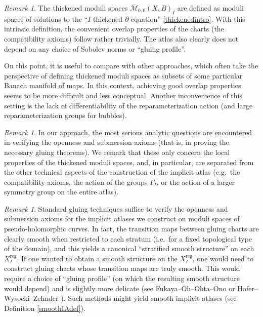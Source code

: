\documentclass[12pt]{article}
\theoremstyle{definition}
\theoremstyle{remark}
\newtheorem{remark}[theorem]{Remark}
\numberwithin{equation}{subsection}
\newcommand{\Mbar}{\overline{\mathcal M}}
\newcommand{\delbar}{\bar\partial}
\newcommand{\reg}{\mathrm{reg}}
\begin{document}
\begin{remark}
The thickened moduli spaces $\Mbar_{0,0}(X,B)_I$ are defined as moduli spaces of solutions to the ``$I$-thickened $\delbar$-equation'' \eqref{thickenedintro}.  With this intrinsic definition, the convenient overlap properties of the charts (the compatibility axioms) follow rather trivially.  The atlas also clearly does not depend on any choice of Sobolev norms or ``gluing profile''.

On this point, it is useful to compare with other approaches, which often take the perspective of defining thickened moduli spaces as subsets of some particular Banach manifold of maps.  In this context, achieving good overlap properties seems to be more difficult and less conceptual.  Another inconvenience of this setting is the lack of differentiability of the reparameterization action (and large reparameterization groups for bubbles).
\end{remark}

\begin{remark}
In our approach, the most serious analytic questions are encountered in verifying the openness and submersion axioms (that is, in proving the necessary gluing theorems).  We remark that these only concern the local properties of the thickened moduli spaces, and, in particular, are separated from the other technical aspects of the construction of the implicit atlas (e.g.\ the compatibility axioms, the action of the groups $\Gamma_I$, or the action of a larger symmetry group on the entire atlas).
\end{remark}

\begin{remark}
Standard gluing techniques suffice to verify the openness and submersion axioms for the implicit atlases we construct on moduli spaces of pseudo-holomorphic curves.  In fact, the transition maps between gluing charts are clearly smooth when restricted to each stratum (i.e.\ for a fixed topological type of the domain), and this yields a canonical ``stratified smooth structure'' on each $X_I^\reg$.  If one wanted to obtain a smooth structure on the $X_I^\reg$, one would need to construct gluing charts whose transition maps are truly smooth.  This would require a choice of ``gluing profile'' (on which the resulting smooth structure would depend) and is slightly more delicate (see Fukaya--Oh--Ohta--Ono \cite{FOOOII,foootechnicaldetails} or Hofer--Wysocki--Zehnder \cite{polyfoldGW}).  Such methods might yield smooth implicit atlases (see Definition \ref{smoothIAdef}).
\end{remark}
\end{document}
